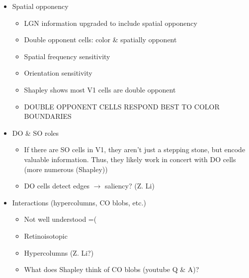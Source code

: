 \documentclass[journal,onecolumn]{IEEEtran}
\begin{document}
\begin{enumerate}
\begin{itemize}
\begin{itemize}
                \end{itemize}
            \item Spatial opponency
                \begin{itemize}
                    \item LGN information upgraded to include spatial opponency
                    \item Double opponent cells: color \& spatially opponent
                    \item Spatial frequency sensitivity
                    \item Orientation sensitivity
                    \item Shapley shows most V1 cells are double opponent
                    \item DOUBLE OPPONENT CELLS RESPOND BEST TO COLOR BOUNDARIES
                \end{itemize}
            \item DO \& SO roles
                \begin{itemize}
                    \item If there are SO cells in V1, they aren't just a stepping stone, but encode valuable information. Thus, they likely work in concert with DO cells (more numerous (Shapley))
                    \item DO cells detect edges $\rightarrow$ saliency? (Z. Li)
                \end{itemize}
            \item Interactions (hypercolumns, CO blobs, etc.)
                \begin{itemize}
                    \item Not well understood =(
                    \item Retinoisotopic
                    \item Hypercolumns (Z. Li?)
                    \item What does Shapley think of CO blobs (youtube Q \& A)?
                \end{itemize}
        \end{itemize}
\end{enumerate}


\ifCLASSOPTIONcaptionsoff
  \newpage
\fi



\end{document}
